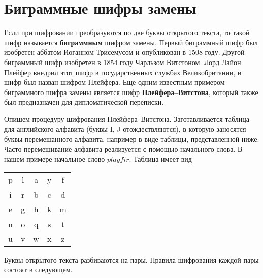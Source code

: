 \section{Биграммные шифры замены}

Если при шифровании преобразуются по две буквы открытого текста, то такой шифр называется \textbf{биграммным} шифром замены. Первый биграммный шифр был изобретен аббатом Иоганном Трисемусом и опубликован в  1508 году. Другой биграммный шифр изобретен в 1854 году Чарльзом Витстоном.  Лорд Лайон Плейфер внедрил этот шифр в государственных службах Великобритании, и шифр был назван шифром Плейфера. Еще одним известным примером биграммного шифра замены является шифр  \textbf{Плейфера--Витстона}, который также был предназначен для дипломатической переписки.

Опишем процедуру шифрования Плейфера--Витстона. Заготавливается таблица для английского алфавита (буквы I, J отождествляются), в которую заносятся буквы перемешанного алфавита, например в виде таблицы, представленной ниже. Часто перемешивание алфавита реализуется с помощью начального слова. В нашем примере начальное слово $playfir$. Таблица имеет вид

\begin{center}
    \begin{tabular}{ccccc}
        p & l & a & y & f  \\
        i & r & b & c & d  \\
        e & g & h & k & m  \\
        n & o & q & s & t  \\
        u & v & w & x & z  \\
    \end{tabular}
\end{center}

Буквы открытого текста разбиваются на пары. Правила шифрования каждой пары состоят в следующем.

